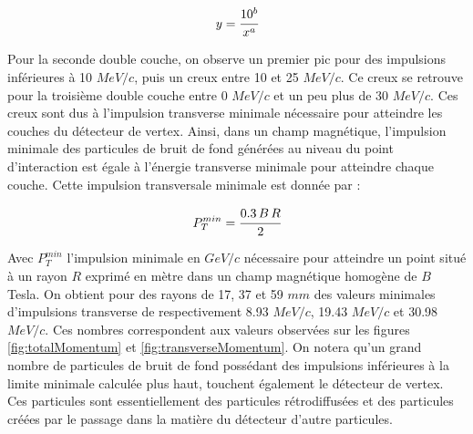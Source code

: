   
  \begin{equation}
   y = \cfrac{10^b}{x^a}
  \end{equation}
  
  Pour la seconde double couche, on observe un premier pic pour des impulsions inf\'erieures à 10 $MeV/c$, puis un creux entre 10 et 25 $MeV/c$. Ce creux se retrouve pour la troisi\`eme double couche entre 0 $MeV/c$ et un peu plus de 30 $MeV/c$. Ces creux sont dus \`a l'impulsion transverse minimale n\'ecessaire pour atteindre les couches du d\'etecteur de vertex. Ainsi, dans un champ magn\'etique, l'impulsion minimale des particules de bruit de fond g\'en\'er\'ees au niveau du point d'interaction est \'egale \`a l'\'energie transverse minimale pour atteindre chaque couche. Cette impulsion transversale minimale est donn\'ee par :
  
  \begin{equation}
   P_{T}^{min} = \cfrac{ 0.3 \, B \, R }{2}
  \end{equation}
  
  Avec $P_{T}^{min}$ l'impulsion minimale en $GeV/c$ n\'ecessaire pour atteindre un point situ\'e \`a un rayon $R$ exprim\'e en m\`etre dans un champ magn\'etique homog\`ene de $B$ Tesla. On obtient pour des rayons de 17, 37 et 59 $mm$ des valeurs minimales d'impulsions transverse de respectivement 8.93 $MeV/c$, 19.43 $MeV/c$ et 30.98 $MeV/c$. Ces nombres correspondent aux valeurs observ\'ees sur les figures \ref{fig:totalMomentum} et \ref{fig:transverseMomentum}. On notera qu'un grand nombre de particules de bruit de fond poss\'edant des impulsions inf\'erieures \`a la limite minimale calcul\'ee plus haut, touchent \'egalement le d\'etecteur de vertex. Ces particules sont essentiellement des particules r\'etrodiffus\'ees et des particules cr\'e\'ees par le passage dans la mati\`ere du d\'etecteur d'autre particules.
  
%   

